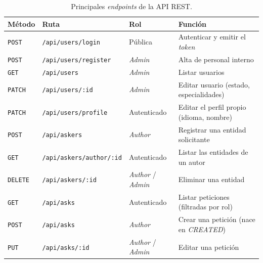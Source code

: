 \documentclass[11pt,oneside,spanish,listoffigures,listoftables]{tfgetsinf}
\begin{document}
\begin{table}[ht]
\centering
\caption[Principales endpoints de la API REST]{Principales \textit{endpoints} de la API REST.}
\label{tab:endpoints}
\footnotesize
\renewcommand{\arraystretch}{1.2}
\begin{tabularx}{\textwidth}{%
  >{\raggedright\arraybackslash}p{1.1cm}%
  >{\raggedright\arraybackslash}p{4.0cm}%
  >{\raggedright\arraybackslash}p{2.9cm}%
  >{\raggedright\arraybackslash}X}
\toprule
\textbf{Método} & \textbf{Ruta} & \textbf{Rol} & \textbf{Función} \\
\midrule
\texttt{POST}   & \texttt{/api/users/login}        & Pública                                                & Autenticar y emitir el \textit{token} \\
\texttt{POST}   & \texttt{/api/users/register}     & \textit{Admin}                                         & Alta de personal interno \\
\texttt{GET}    & \texttt{/api/users}              & \textit{Admin}                                         & Listar usuarios \\
\texttt{PATCH}  & \texttt{/api/users/:id}          & \textit{Admin}                                         & Editar usuario (estado, especialidades) \\
\texttt{PATCH}  & \texttt{/api/users/profile}      & Autenticado                                            & Editar el perfil propio (idioma, nombre) \\
\midrule
\texttt{POST}   & \texttt{/api/askers}             & \textit{Author}                                        & Registrar una entidad solicitante \\
\texttt{GET}    & \texttt{/api/askers/author/:id}  & Autenticado                                            & Listar las entidades de un autor \\
\texttt{DELETE} & \texttt{/api/askers/:id}         & \textit{Author} / \textit{Admin}                       & Eliminar una entidad \\
\midrule
\texttt{GET}    & \texttt{/api/asks}               & Autenticado                                            & Listar peticiones (filtradas por rol) \\
\texttt{POST}   & \texttt{/api/asks}               & \textit{Author}                                        & Crear una petición (nace en \textit{CREATED}) \\
\texttt{PUT}    & \texttt{/api/asks/:id}           & \textit{Author} / \textit{Admin}                       & Editar una petición \\

\end{tabularx}
\end{table}
\end{document}
